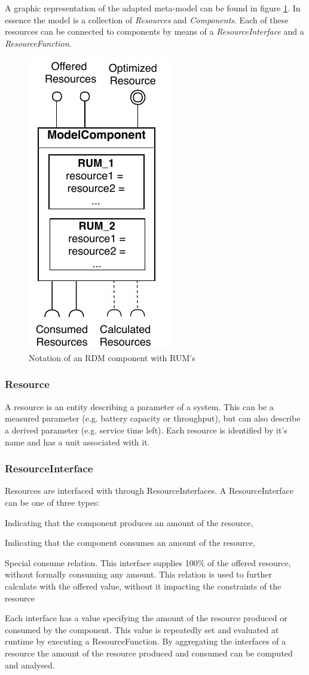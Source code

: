 A graphic representation of the adapted meta-model can be found in figure \ref{fig:component}. In essence the model is a collection of \emph{Resources} and \emph{Components}. Each of these resources can be connected to components by means of a \emph{ResourceInterface} and a \emph{ResourceFunction}. 
\begin{figure}
\centering
  \includegraphics[width=0.3\linewidth]{resources/img/component.pdf}
  \caption{Notation of an RDM component with RUM's}
  \label{fig:component}
\end{figure}

\subsubsection{Resource}
A resource is an entity describing a parameter of a system. This can be a measured parameter (e.g. battery capacity or throughput), but can also describe a derived parameter (e.g. service time left). Each resource is identified by it's name and has a unit associated with it. 

\subsubsection{ResourceInterface}
Resources are interfaced with through ResourceInterfaces. A ResourceInterface can be one of three types:
\begin{description}
\nospace
\item[Offer] Indicating that the component produces an amount of the resource,
\item[Consume] Indicating that the component consumes an amount of the resource,
\item[Calculate] Special consume relation. This interface supplies 100\% of the offered resource, without formally consuming any amount. This relation is used to further calculate with the offered value, without it impacting the constraints of the resource%
\end{description}
Each interface has a value specifying the amount of the resource produced or consumed by the component. This value is repeatedly set and evaluated at runtime by executing a ResourceFunction. By aggregating the interfaces of a resource the amount of the resource produced and consumed can be computed and analysed.

